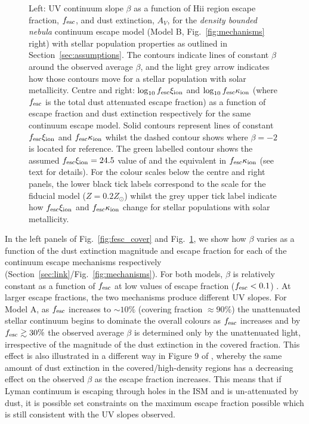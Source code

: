 \begin{landscape}
\begin{figure}
  \caption[UV continuum slope $\beta$, $\log_{10}f_{\rm{esc}}\xi_{\rm{ion}}$ and $\log_{10}f_{\rm{esc}}\kappa_{\rm{ion}}$ as a function of total escape fraction, $f_{\rm{esc}}$, and dust extinction, $A_{V}$, for the \emph{density bounded nebula} continuum escape model.]{Left: UV continuum slope $\beta$ as a function of {\sc Hii} region escape fraction, $f_{\rm{esc}}$, and dust extinction, $A_{V}$, for the \emph{density bounded nebula} continuum escape model (Model B, Fig.~\ref{fig:mechanisms} right) with stellar population properties as outlined in Section~\ref{sec:assumptions}. The contours indicate lines of constant $\beta$ around the observed average $\beta$, and the light grey arrow indicates how those contours move for a stellar population with solar metallicity. Centre and right: $\log_{10}f_{\rm{esc}}\xi_{\rm{ion}}$ and $\log_{10}f_{\rm{esc}}\kappa_{\rm{ion}}$ (where $f_{\rm{esc}}$ is the total dust attenuated escape fraction) as a function of escape fraction and dust extinction respectively for the same continuum escape model. Solid contours represent lines of constant $f_{\rm{esc}}\xi_{\rm{ion}}$ and $f_{\rm{esc}}\kappa_{\rm{ion}}$ whilst the dashed contour shows where $\beta = -2$ is located for reference. The green labelled contour shows the assumed $f_{\rm{esc}}\xi_{\rm{ion}} = 24.5$ value of \citet{Robertson:2013ji} and the equivalent in $f_{\rm{esc}}\kappa_{\rm{ion}}$ (see text for details). For the colour scales below the centre and right panels, the lower black tick labels correspond to the scale for the fiducial model ($Z = 0.2 Z_{\odot}$) whilst the grey upper tick label indicate how $f_{\rm{esc}}\xi_{\rm{ion}}$ and $f_{\rm{esc}}\kappa_{\rm{ion}}$ change for stellar populations with solar metallicity.}
  \label{fig:fesc_dens}
\end{figure}
\end{landscape}


In the left panels of Fig.~\ref{fig:fesc_cover} and Fig.~\ref{fig:fesc_dens}, we show how $\beta$ varies as a function of the dust extinction magnitude and escape fraction for each of the continuum escape mechanisms respectively (Section~\ref{sec:link}/Fig.~\ref{fig:mechanisms}). For both models, $\beta$ is relatively constant as a function of $f_{\rm{esc}}$ at low values of escape fraction ($f_{\rm{esc}} < 0.1$) . At larger escape fractions, the two mechanisms produce different UV slopes. For Model A, as $f_{\rm{esc}}$ increases to $\sim10\%$ (covering fraction $\approx 90\%$) the unattenuated stellar continuum begins to dominate the overall colours as $f_{\rm{esc}}$ increases and by $f_{\rm{esc}} \gtrsim 30\%$ the observed average $\beta$ is determined only by the unattenuated light, irrespective of the magnitude of the dust extinction in the covered fraction. This effect is also illustrated in a different way in Figure 9 of \citet{Zackrisson:2013iz}, whereby the same amount of dust extinction in the covered/high-density regions has a decreasing effect on the observed $\beta$ as the escape fraction increases. This means that if Lyman continuum is escaping through holes in the ISM and is un-attenuated by dust, it is possible set constraints on the maximum escape fraction possible which is still consistent with the UV slopes observed.

